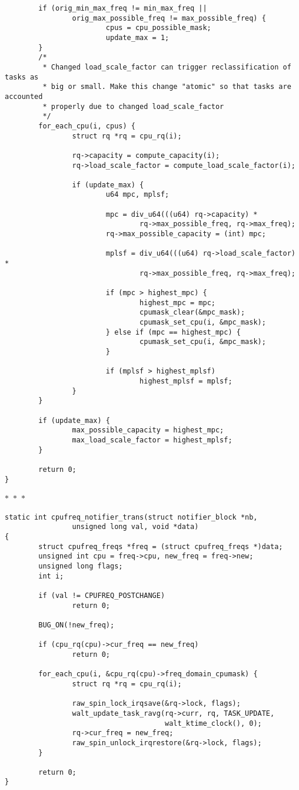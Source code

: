 \documentclass{article}
\newcommand{\divider}{{\begin{center}
  $\ast$~$\ast$~$\ast$
\end{center}}}
\begin{document}
\begin{verbatim}
        if (orig_min_max_freq != min_max_freq ||
                orig_max_possible_freq != max_possible_freq) {
                        cpus = cpu_possible_mask;
                        update_max = 1;
        }
        /*
         * Changed load_scale_factor can trigger reclassification of tasks as
         * big or small. Make this change "atomic" so that tasks are accounted
         * properly due to changed load_scale_factor
         */
        for_each_cpu(i, cpus) {
                struct rq *rq = cpu_rq(i);

                rq->capacity = compute_capacity(i);
                rq->load_scale_factor = compute_load_scale_factor(i);

                if (update_max) {
                        u64 mpc, mplsf;

                        mpc = div_u64(((u64) rq->capacity) *
                                rq->max_possible_freq, rq->max_freq);
                        rq->max_possible_capacity = (int) mpc;

                        mplsf = div_u64(((u64) rq->load_scale_factor) *
                                rq->max_possible_freq, rq->max_freq);

                        if (mpc > highest_mpc) {
                                highest_mpc = mpc;
                                cpumask_clear(&mpc_mask);
                                cpumask_set_cpu(i, &mpc_mask);
                        } else if (mpc == highest_mpc) {
                                cpumask_set_cpu(i, &mpc_mask);
                        }

                        if (mplsf > highest_mplsf)
                                highest_mplsf = mplsf;
                }
        }

        if (update_max) {
                max_possible_capacity = highest_mpc;
                max_load_scale_factor = highest_mplsf;
        }

        return 0;
}
\end{verbatim}
\divider
\begin{verbatim}
static int cpufreq_notifier_trans(struct notifier_block *nb,
                unsigned long val, void *data)
{
        struct cpufreq_freqs *freq = (struct cpufreq_freqs *)data;
        unsigned int cpu = freq->cpu, new_freq = freq->new;
        unsigned long flags;
        int i;

        if (val != CPUFREQ_POSTCHANGE)
                return 0;

        BUG_ON(!new_freq);

        if (cpu_rq(cpu)->cur_freq == new_freq)
                return 0;

        for_each_cpu(i, &cpu_rq(cpu)->freq_domain_cpumask) {
                struct rq *rq = cpu_rq(i);

                raw_spin_lock_irqsave(&rq->lock, flags);
                walt_update_task_ravg(rq->curr, rq, TASK_UPDATE,
                                      walt_ktime_clock(), 0);
                rq->cur_freq = new_freq;
                raw_spin_unlock_irqrestore(&rq->lock, flags);
        }

        return 0;
}
\end{verbatim}
\end{document}
